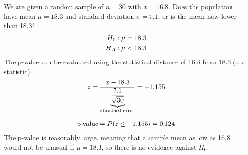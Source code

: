 \begin{example}
    We are given a random sample of $n=30$ with $\bar{x}=16.8$. Does the population have mean $\mu=18.3$ and standard deviation $\sigma=7.1$, or is the mean now lower than 18.3?
    \begin{align}
        H_0: \mu &= 18.3 \notag \\
        H_A: \mu &< 18.3 \notag
    \end{align}
    The p-value can be evaluated using the statistical distance of 16.8 from 18.3 (a z statistic).
    \begin{align}
        z = \frac{\bar{x} - 18.3}{\underbrace{\frac{7.1}{\sqrt{30}}}_{\text{standard error}}} = -1.155 \notag
    \end{align}
    \begin{center}
    \end{center}
    \begin{align}
        \text{p-value} = P(z \le -1.155) = 0.124 \notag
    \end{align}
    The p-value is reasonably large, meaning that a sample mean as low as 16.8 would not be unusual if $\mu=18.3$, so there is no evidence against $H_0$.
\end{example}

